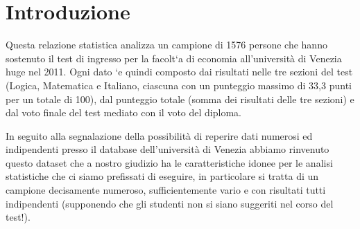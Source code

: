 \section{Introduzione}
Questa relazione statistica analizza un campione di 1576 persone che hanno
sostenuto il test di ingresso per la facolt`a di economia all’università di Venezia
huge nel 2011. Ogni dato `e quindi composto dai risultati nelle tre sezioni del
test (Logica, Matematica e Italiano, ciascuna con un punteggio massimo di 33,3
punti per un totale di 100), dal punteggio totale (somma dei risultati delle tre
sezioni) e dal voto finale del test mediato con il voto del diploma.

In seguito alla segnalazione della possibilità di reperire dati numerosi ed
indipendenti presso il database dell’università di Venezia abbiamo rinvenuto
questo dataset che a nostro giudizio ha le caratteristiche idonee per le analisi
statistiche che ci siamo prefissati di eseguire, in particolare si tratta di un
campione decisamente numeroso, sufficientemente vario e con risultati tutti
indipendenti (supponendo che gli studenti non si siano suggeriti nel corso del
test!).
